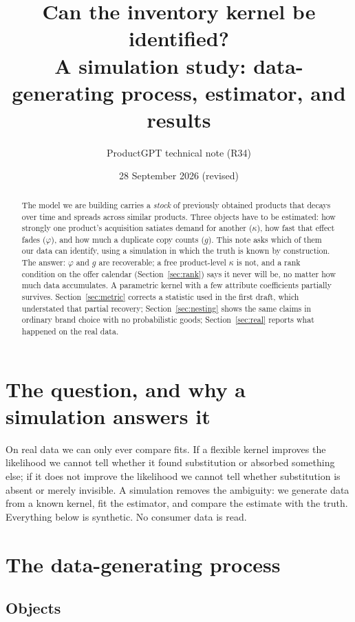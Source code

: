 \documentclass[11pt]{article}
\title{\textbf{Can the inventory kernel be identified?}\\[2pt]
\large A simulation study: data-generating process, estimator, and results}
\author{ProductGPT technical note (R34)}
\date{28 September 2026 (revised)}
\begin{document}
\maketitle

\begin{abstract}
\noindent The model we are building carries a \emph{stock} of previously obtained
products that decays over time and spreads across similar products. Three
objects have to be estimated: how strongly one product's acquisition satiates
demand for another ($\kappa$), how fast that effect fades ($\varphi$), and how
much a duplicate copy counts ($g$). This note asks which of them our data can
identify, using a simulation in which the truth is known by construction.
The answer: $\varphi$ and $g$ are recoverable; a free product-level $\kappa$ is
not, and a rank condition on the offer calendar (Section~\ref{sec:rank}) says
it never will be, no matter how much data accumulates. A parametric kernel with
a few attribute coefficients partially survives. Section~\ref{sec:metric}
corrects a statistic used in the first draft, which understated that partial
recovery; Section~\ref{sec:nesting} shows the same claims in ordinary brand
choice with no probabilistic goods; Section~\ref{sec:real} reports what
happened on the real data.
\end{abstract}

\section{The question, and why a simulation answers it}

On real data we can only ever compare fits. If a flexible kernel improves the
likelihood we cannot tell whether it found substitution or absorbed something
else; if it does not improve the likelihood we cannot tell whether substitution
is absent or merely invisible. A simulation removes the ambiguity: we generate
data from a known kernel, fit the estimator, and compare the estimate with the
truth. Everything below is synthetic. No consumer data is read.

\section{The data-generating process}\label{sec:dgp}

\subsection{Objects}
\end{document}
